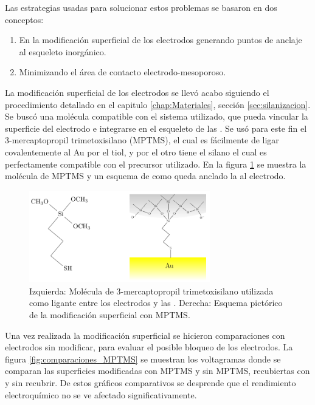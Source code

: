 			Las estrategias usadas para solucionar estos problemas se basaron en dos conceptos:
				\begin{enumerate}

					\item En la modificación superficial de los electrodos generando puntos de anclaje al esqueleto inorgánico.

					\item Minimizando el área de contacto electrodo-mesoporoso.

					\end{enumerate}
			La modificación superficial de los electrodos se llevó acabo siguiendo el procedimiento detallado en el capitulo \ref{chap:Materiales}, sección \ref{sec:silanizacion}. Se buscó una molécula compatible con el sistema utilizado, que pueda vincular la superficie del electrodo e integrarse en el esqueleto de las \pdm. Se usó para este fin el 3-mercaptopropil trimetoxisilano (MPTMS), el cual es fácilmente de ligar covalentemente al Au\cite{Gosser} por el tiol, y por el otro tiene el silano el cual es perfectamente compatible con el precursor utilizado\cite{Wu2014,Wu2013,Chen2011}. En la figura \ref{fig:mod_sup} se muestra la molécula de MPTMS y un esquema de como queda anclado la \pdm\space al electrodo.
					\begin{figure}[!ht]
							\begin{center}
							\includegraphics[width=0.70\textwidth]{Esquemas/mod_sup.pdf}
							\caption[Modificación superficial de los electrodos.]{Izquierda: Molécula de  3-mercaptopropil trimetoxisilano utilizada como ligante entre los electrodos y las \pdm. Derecha: Esquema pictórico de la modificación superficial con MPTMS.}
							\label{fig:mod_sup}
							\end{center}
							\end{figure}
			Una vez realizada la modificación superficial se hicieron comparaciones con electrodos sin modificar, para evaluar el posible bloqueo de los electrodos. La figura \ref{fig:comparaciones_MPTMS} se muestran los voltagramas donde se comparan las superficies modificadas con MPTMS y sin MPTMS, recubiertas con \pdm\space y sin recubrir. De estos gráficos comparativos se desprende que el rendimiento electroquímico no se ve afectado significativamente.
